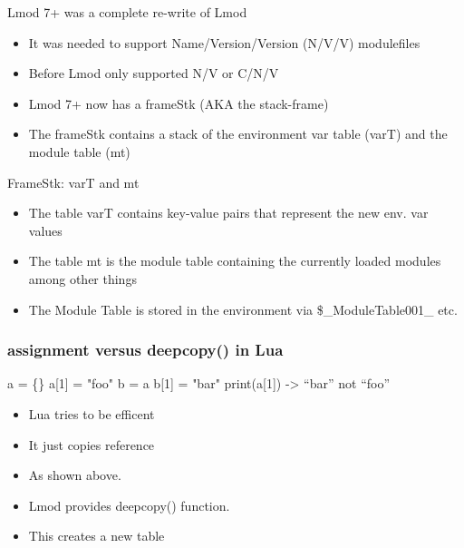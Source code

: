 \documentclass{beamer}
\begin{document}
\begin{frame}{Lmod 7+ was a complete re-write of Lmod}
  \begin{itemize}
    \item It was needed to support Name/Version/Version (N/V/V) modulefiles
    \item Before Lmod only supported N/V or C/N/V
    \item Lmod 7+ now has a frameStk (AKA the stack-frame)
    \item The frameStk contains a stack of the environment var table (varT) and the
      module table (mt)
  \end{itemize}
\end{frame}

\begin{frame}{FrameStk: varT and mt}
  \begin{itemize}
    \item The table varT contains key-value pairs that represent the
      new env. var values
    \item The table mt is the module table containing the currently
      loaded modules among other things
    \item The Module Table is stored in the environment via
      \$\_ModuleTable001\_ etc.
  \end{itemize}
\end{frame}

\begin{frame}[fragile]
    \frametitle{assignment versus deepcopy() in Lua}
 {\small
    \begin{semiverbatim}
  a = \{\}
  a[1] = "foo"
  b    = a
  b[1] = "bar"
  print(a[1])  -> ``bar'' not ``foo''
    \end{semiverbatim}
}
  \begin{itemize}
    \item Lua tries to be efficent
    \item It just copies reference
    \item As shown above.
    \item Lmod provides deepcopy() function.
    \item This creates a new table
  \end{itemize}
\end{frame}
\end{document}
